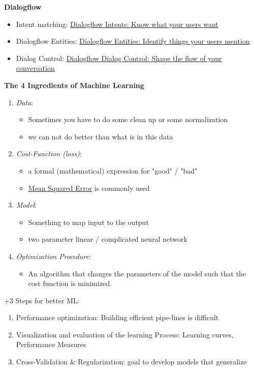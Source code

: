 \documentclass[11pt,twoside,landscape]{article}
\begin{document}
\begin{multicols}{3}
\textbf{Dialogflow}

\begin{itemize}
\item Intent matching: \href{https://www.youtube.com/watch?v=9aHusGxntPw}{Dialogflow Intents: Know what your users want}
\item Dialogflow Entities: \href{https://www.youtube.com/watch?v=kzdL6GxJ\_WY}{Dialogflow Entities: Identify things your users mention}
\item Dialog Control: \href{https://youtu.be/-tOamKtmxdY}{Dialogflow Dialog Control: Shape the flow of your conversation}
\end{itemize}



\textbf{The 4 Ingredients of Machine Learning}

\begin{enumerate}
\item \emph{Data}:
\begin{itemize}
\item Sometimes you have to do some clean up or some normalization
\item we can not do better than what is in this data
\end{itemize}
\item \emph{Cost-Function (loss)}:
\begin{itemize}
\item a formal (mathematical) expression for "good" / "bad"
\item \href{../../../roam/20211004175550-mean_squared_error.org}{Mean Squared Error} is commonly used
\end{itemize}
\item \emph{Model}:
\begin{itemize}
\item Something to map input to the output
\item two parameter linear / complicated neural network
\end{itemize}
\item \emph{Optimization Procedure}:
\begin{itemize}
\item An algorithm that changes the parameters of the model such that the cost function is minimized.
\end{itemize}
\end{enumerate}

+3 Steps for better ML:
\begin{enumerate}
\item Performance optimization: Building efficient pipe-lines is difficult
\item Visualization and evaluation of the learning Process: Learning curves, Performance Measures
\item Cross-Validation \& Regularization: goal to develop models that generalize
\end{enumerate}


\end{multicols}
\end{document}
